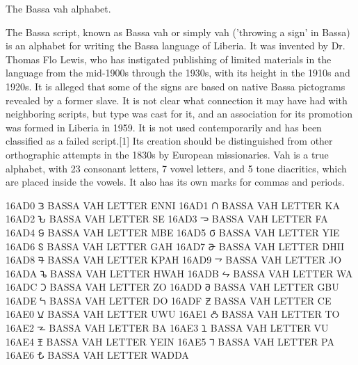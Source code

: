 \newfontfamily{}

The Bassa vah alphabet.

The Bassa script, known as Bassa vah or simply vah ('throwing a sign' in Bassa) is an alphabet for writing the Bassa language of Liberia. It was invented by Dr. Thomas Flo Lewis, who has instigated publishing of limited materials in the language from the mid-1900s through the 1930s, with its height in the 1910s and 1920s. It is alleged that some of the signs are based on native Bassa pictograms revealed by a former slave. It is not clear what connection it may have had with neighboring scripts, but type was cast for it, and an association for its promotion was formed in Liberia in 1959. It is not used contemporarily and has been classified as a failed script.[1] Its creation should be distinguished from other orthographic attempts in the 1830s by European missionaries.
Vah is a true alphabet, with 23 consonant letters, 7 vowel letters, and 5 tone diacritics, which are placed inside the vowels. It also has its own marks for commas and periods.

\bgroup
\obeyline
16AD0 𖫐 BASSA VAH LETTER ENNI
16AD1 𖫑 BASSA VAH LETTER KA
16AD2 𖫒 BASSA VAH LETTER SE
16AD3 𖫓 BASSA VAH LETTER FA
16AD4 𖫔 BASSA VAH LETTER MBE
16AD5 𖫕 BASSA VAH LETTER YIE
16AD6 𖫖 BASSA VAH LETTER GAH
16AD7 𖫗 BASSA VAH LETTER DHII
16AD8 𖫘 BASSA VAH LETTER KPAH
16AD9 𖫙 BASSA VAH LETTER JO
16ADA 𖫚 BASSA VAH LETTER HWAH
16ADB 𖫛 BASSA VAH LETTER WA
16ADC 𖫜 BASSA VAH LETTER ZO
16ADD 𖫝 BASSA VAH LETTER GBU
16ADE 𖫞 BASSA VAH LETTER DO
16ADF 𖫟 BASSA VAH LETTER CE
16AE0 𖫠 BASSA VAH LETTER UWU
16AE1 𖫡 BASSA VAH LETTER TO
16AE2 𖫢 BASSA VAH LETTER BA
16AE3 𖫣 BASSA VAH LETTER VU
16AE4 𖫤 BASSA VAH LETTER YEIN
16AE5 𖫥 BASSA VAH LETTER PA
16AE6 𖫦 BASSA VAH LETTER WADDA

\egroup